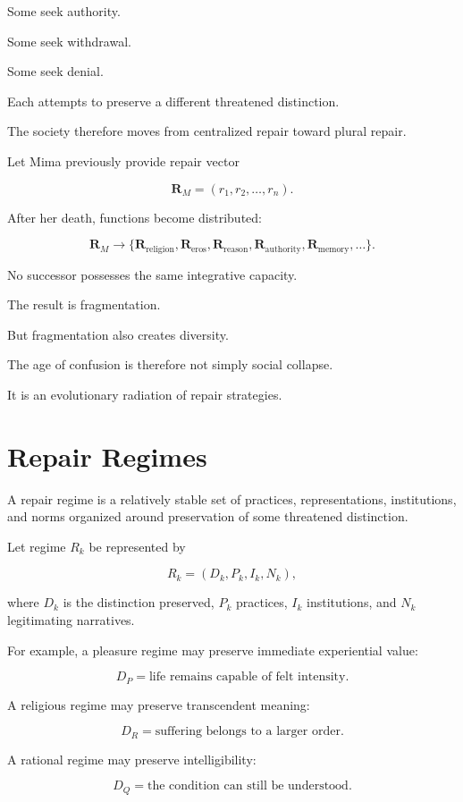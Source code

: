 \documentclass[11pt,oneside]{book}
\theoremstyle{definition}
\theoremstyle{remark}
\begin{document}
Some seek authority.

Some seek withdrawal.

Some seek denial.

Each attempts to preserve a different threatened distinction.

The society therefore moves from centralized repair toward plural repair.

Let Mima previously provide repair vector

\[
\mathbf R_M
=
(r_1,r_2,\ldots,r_n).
\]

After her death, functions become distributed:

\[
\mathbf R_M
\rightarrow
\{
\mathbf R_{\mathrm{religion}},
\mathbf R_{\mathrm{eros}},
\mathbf R_{\mathrm{reason}},
\mathbf R_{\mathrm{authority}},
\mathbf R_{\mathrm{memory}},
\ldots
\}.
\]

No successor possesses the same integrative capacity.

The result is fragmentation.

But fragmentation also creates diversity.

The age of confusion is therefore not simply social collapse.

It is an evolutionary radiation of repair strategies.

\section{Repair Regimes}

A repair regime is a relatively stable set of practices, representations, institutions, and norms organized around preservation of some threatened distinction.

Let regime \(R_k\) be represented by

\[
R_k
=
(D_k,P_k,I_k,N_k),
\]

where \(D_k\) is the distinction preserved, \(P_k\) practices, \(I_k\) institutions, and \(N_k\) legitimating narratives.

For example, a pleasure regime may preserve immediate experiential value:

\[
D_P
=
\text{life remains capable of felt intensity}.
\]

A religious regime may preserve transcendent meaning:

\[
D_R
=
\text{suffering belongs to a larger order}.
\]

A rational regime may preserve intelligibility:

\[
D_Q
=
\text{the condition can still be understood}.
\]
\end{document}
